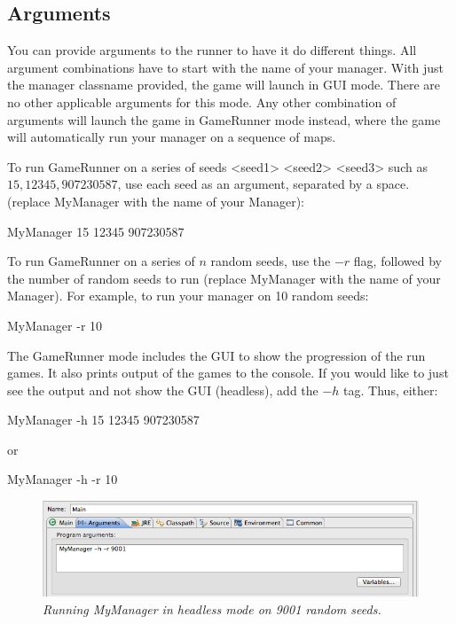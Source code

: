 \documentclass[11pt]{article}
\begin{document}
\subsection{Arguments}
You can provide arguments to the runner to have it do different things. All argument combinations have to start with the name of your manager. With just the manager classname provided, the game will launch in GUI mode. There are no other applicable arguments for this mode. Any other combination of arguments will launch the game in GameRunner mode instead, where the game will automatically run your manager on a sequence of maps. 

To run GameRunner on a series of seeds <seed1> <seed2> <seed3> such as $15, 12345, 907230587$, use each seed as an argument, separated by a space. (replace MyManager with the name of your Manager):
\begin{center}
MyManager 15 12345 907230587
\end{center}
To run GameRunner on a series of $n$ random seeds, use the $-r$ flag, followed by the number of random seeds to run (replace MyManager with the name of your Manager). For example, to run your manager on 10 random seeds:
\begin{center}
MyManager -r 10
\end{center}
The GameRunner mode includes the GUI to show the progression of the run games. It also prints output of the games to the console. If you would like to just see the output and not show the GUI (headless), add the $-h$ tag. Thus, either:
\begin{center}
MyManager -h 15 12345 907230587
\end{center}
or
\begin{center}
MyManager -h -r 10
\end{center}
\begin{figure}[h]
\centerline{\includegraphics[scale=0.65]{args.png}} 
\caption{\em{Running MyManager in headless mode on 9001 random seeds.}}
\end{figure}
\end{document}
